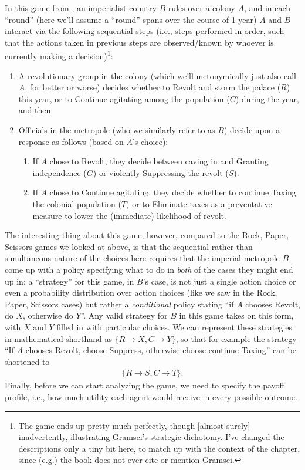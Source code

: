 In this game from \cite{mccarty_political_game_theory}, an imperialist country $B$ rules over a colony $A$, and in each ``round'' (here we'll assume a ``round'' spans over the course of 1 year) $A$ and $B$ interact via the following sequential steps (i.e., steps performed in order, such that the actions taken in previous steps are observed/known by whoever is currently making a decision)\footnote{The game ends up pretty much perfectly, though [almost surely] inadvertently, illustrating Gramsci's strategic dichotomy. I've changed the descriptions only a tiny bit here, to match up with the context of the chapter, since (e.g.) the book does not ever cite or mention Gramsci.}:
\begin{enumerate}
	\item A revolutionary group in the colony (which we'll metonymically just also call $A$, for better or worse) decides whether to Revolt and storm the palace ($R$) this year, or to Continue agitating among the population ($C$) during the year, and then
	\item Officials in the metropole (who we similarly refer to as $B$) decide upon a response as follows (based on $A$'s choice):
	\begin{enumerate}
		\item If $A$ chose to Revolt, they decide between caving in and Granting independence ($G$) or violently Suppressing the revolt ($S$).
		\item If $A$ chose to Continue agitating, they decide whether to continue Taxing the colonial population ($T$) or to Eliminate taxes as a preventative measure to lower the (immediate) likelihood of revolt.
	\end{enumerate}
\end{enumerate}
The interesting thing about this game, however, compared to the Rock, Paper, Scissors games we looked at above, is that the sequential rather than simultaneous nature of the choices here requires that the imperial metropole $B$ come up with a policy specifying what to do in \textit{both} of the cases they might end up in: a ``strategy'' for this game, in $B$'s case, is not just a single action choice or even a probability distribution over action choices (like we saw in the Rock, Paper, Scissors cases) but rather a \textit{conditional} policy stating ``if $A$ chooses Revolt, do $X$, otherwise do $Y$''. Any valid strategy for $B$ in this game takes on this form, with $X$ and $Y$ filled in with particular choices. We can represent these strategies in mathematical shorthand as $\{R \rightarrow X, C \rightarrow Y\}$, so that for example the strategy ``If $A$ chooses Revolt, choose Suppress, otherwise choose continue Taxing'' can be shortened to
\begin{align*}
	\{R \rightarrow S, C \rightarrow T\}.
\end{align*}
Finally, before we can start analyzing the game, we need to specify the payoff profile, i.e., how much utility each agent would receive in every possible outcome.

